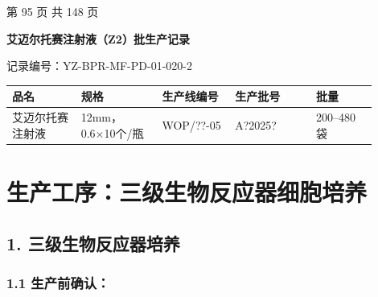 \documentclass[UTF8,10pt,a4paper,fontset=fandol]{ctexart}
\newcommand{\fieldvalue}[1]{#1}
\newcommand{\handwritten}[1]{#1}
\begin{document}
\vfill

\begin{center}
\scriptsize 第 95 页 共 148 页
\end{center}


\newpage

\begin{center}
\textbf{艾迈尔托赛注射液（Z2）批生产记录}
\end{center}

\begin{flushright}
记录编号：YZ-BPR-MF-PD-01-020-2
\end{flushright}

\begin{tabular}{|p{0.17\linewidth}|p{0.20\linewidth}|p{0.18\linewidth}|p{0.20\linewidth}|p{0.15\linewidth}|}
\hline
品名 & 规格 & 生产线编号 & 生产批号 & 批量 \\ \hline
艾迈尔托赛注射液 & 12mm，0.6×10个/瓶 &
\fieldvalue{\handwritten{WOP/??-05}} &
\fieldvalue{\handwritten{A?2025?}} &
200--480袋 \\ \hline
\end{tabular}

\section{生产工序：三级生物反应器细胞培养}

\subsection{1. 三级生物反应器培养}

\subsubsection{1.1 生产前确认：}
\end{document}
